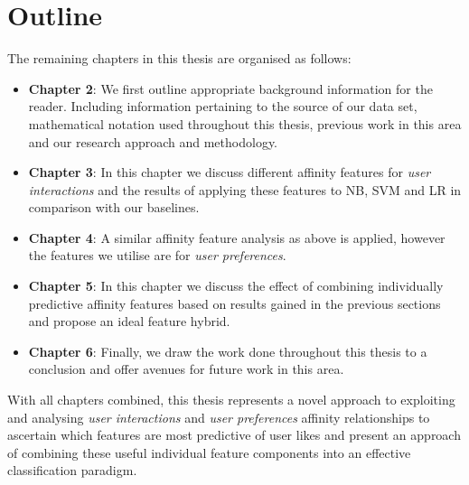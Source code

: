 \section{Outline}
\label{sec:outline}

The remaining chapters in this thesis are organised as follows:
\begin{itemize}
\item \textbf{Chapter 2}: We first outline appropriate background information for the reader. Including information pertaining to the source of 
our data set, mathematical notation used throughout this thesis, previous work in this area and our research approach and methodology.
\item \textbf{Chapter 3}: In this chapter we discuss different affinity features for \emph{user interactions} and the results of applying these features to NB, SVM and LR 
in comparison with our baselines.
\item \textbf{Chapter 4}: A similar affinity feature analysis as above is applied, however the features we utilise are for \emph{user preferences}.
\item \textbf{Chapter 5}: In this chapter we discuss the effect of combining individually predictive affinity features based on results gained in the previous sections
and propose an ideal feature hybrid.
\item \textbf{Chapter 6}: Finally, we draw the work done throughout this thesis to a conclusion and offer avenues for future work in this area.
\end{itemize}

With all chapters combined, this thesis represents a novel approach to exploiting and analysing \emph{user interactions} and \emph{user preferences} affinity relationships
to ascertain which features are most predictive of user likes and present an approach of combining these useful individual feature components into an effective 
classification paradigm.

